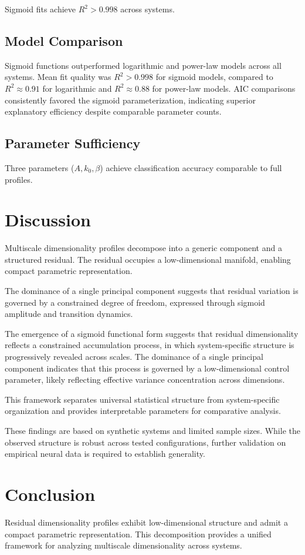 \documentclass[11pt]{article}
\begin{document}
Sigmoid fits achieve $R^2 > 0.998$ across systems.

\subsection{Model Comparison}
Sigmoid functions outperformed logarithmic and power-law models across all systems. Mean fit quality was $R^2 > 0.998$ for sigmoid models, compared to $R^2 \approx 0.91$ for logarithmic and $R^2 \approx 0.88$ for power-law models. AIC comparisons consistently favored the sigmoid parameterization, indicating superior explanatory efficiency despite comparable parameter counts.

\subsection{Parameter Sufficiency}

Three parameters ($A, k_0, \beta$) achieve classification accuracy comparable to full profiles.

\section{Discussion}

Multiscale dimensionality profiles decompose into a generic component and a structured residual. The residual occupies a low-dimensional manifold, enabling compact parametric representation.

The dominance of a single principal component suggests that residual variation is governed by a constrained degree of freedom, expressed through sigmoid amplitude and transition dynamics.

The emergence of a sigmoid functional form suggests that residual dimensionality reflects a constrained accumulation process, in which system-specific structure is progressively revealed across scales. The dominance of a single principal component indicates that this process is governed by a low-dimensional control parameter, likely reflecting effective variance concentration across dimensions.

This framework separates universal statistical structure from system-specific organization and provides interpretable parameters for comparative analysis.

These findings are based on synthetic systems and limited sample sizes. While the observed structure is robust across tested configurations, further validation on empirical neural data is required to establish generality.

\section{Conclusion}

Residual dimensionality profiles exhibit low-dimensional structure and admit a compact parametric representation. This decomposition provides a unified framework for analyzing multiscale dimensionality across systems.



\end{document}
